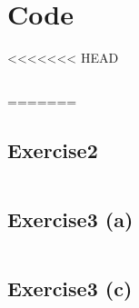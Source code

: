 \documentclass[11pt]{article}
\begin{document}
\pagebreak
\section*{Code}
<<<<<<< HEAD
\inputminted{python}{py/exercise2.py}
=======
\subsection*{Exercise2}
\inputminted{python}{py/exercise2.py}
\pagebreak

\subsection*{Exercise3 (a)}
\inputminted{python}{py/exercise3_a.py}
\pagebreak

\subsection*{Exercise3 (c)}
\inputminted{python}{py/exercise3_a.py}
\end{document}
